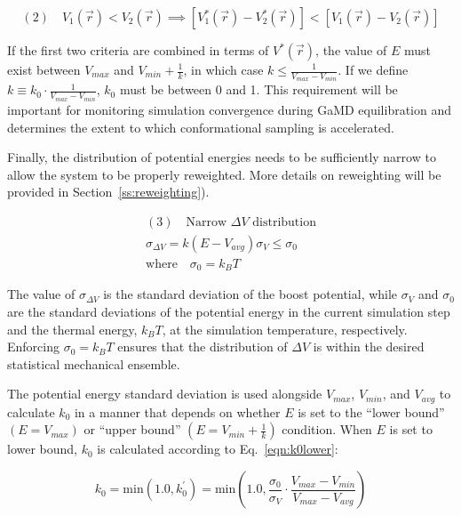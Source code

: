 \documentclass[9pt,tutorial]{livecoms}
\begin{document}
\begin{equation*}
    \boxed{(2)\quad V_{1}\left(\vec{r}\right) < V_{2}\left(\vec{r}\right) \implies \left[V_{1}^{*}\left(\vec{r}\right) - V_{2}^{*}\left(\vec{r}\right)\right] < \left[V_{1}\left(\vec{r}\right) - V_{2}\left(\vec{r}\right)\right]}
\end{equation*}

If the first two criteria are combined in terms of $V^{*}(\vec{r})$, the value of $E$ must exist between $V_{max}$ and $V_{min} + \frac{1}{k}$, in which case $k \leq \frac{1}{V_{max} - V_{min}}$. If we define $k \equiv k_{0} \cdot \frac{1}{V_{max} - V_{min}}$, $k_{0}$ must be between 0 and 1. This requirement will be important for monitoring simulation convergence during GaMD equilibration and determines the extent to which conformational sampling is accelerated. 

Finally, the distribution of potential energies needs to be sufficiently narrow to allow the system to be properly reweighted. More details on reweighting will be provided in Section~\ref{ss:reweighting}). 

\begin{equation*}
    \boxed{
    \begin{gathered}
        (3)\quad\text{Narrow $\Delta{V}$ distribution} \\
        \sigma_{\Delta{V}} = k(E-V_{avg})\sigma_{V} \leq \sigma_{0} \\
        \text{where} \quad \sigma_{0}= k_{B}T
    \end{gathered}
    }
\end{equation*}

The value of $\sigma_{\Delta{V}}$ is the standard deviation of the boost potential, while $\sigma_{V}$ and $\sigma_{0}$ are the standard deviations of the potential energy in the current simulation step and the thermal energy, $k_BT$, at the simulation temperature, respectively. Enforcing $\sigma_{0} = k_BT$ ensures that the distribution of $\Delta{V}$ is within the desired statistical mechanical ensemble.

The potential energy standard deviation is used alongside $V_{max}$, $V_{min}$, and $V_{avg}$ to calculate $k_{0}$ in a manner that depends on whether $E$ is set to the ``lower bound'' $\left(E=V_{max}\right)$ or  ``upper bound'' $\left(E=V_{min}+\frac{1}{k}\right)$ condition. When $E$ is set to lower bound, $k_0$ is calculated according to Eq.~\ref{eqn:k0lower}:

\begin{equation}
    k_{0} = \text{min}\left(1.0,k_{0}^{'}\right) = \text{min} \left (1.0, \frac{\sigma_{0}}{\sigma_{V}} \cdot \frac{V_{max} - {V_{min}}}{V_{max} - V_{avg}} \right) 
    \label{eqn:k0lower}
\end{equation}
\end{document}
